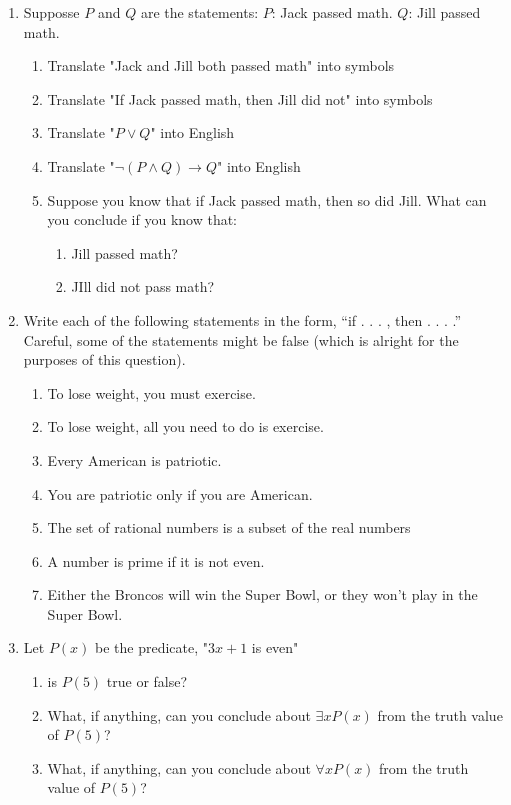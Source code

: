 \documentclass[11pt, a4paper]{article}
\newcommand\setItemNumber[1]{\setcounter{enumi}{\numexpr#1-1\relax}}
\begin{document}
\begin{enumerate}
    \setItemNumber{3}
    \item Supposse $P$ and $Q$ are the statements: $P$: Jack passed math. $Q$: Jill passed math.
        \begin{enumerate}
            \item Translate "Jack and Jill both passed math" into symbols
            \item Translate "If Jack passed math, then Jill did not" into symbols
            \item Translate "$P \lor Q$" into English
            \item Translate "$ \neg(P \land Q) \rightarrow Q$" into English
            \item Suppose you know that if Jack passed math, then so did Jill. What can you conclude if you know that:
                \begin{enumerate}
                    \item Jill passed math?
                    \item JIll did not pass math?
                \end{enumerate}
        \end{enumerate}
    \setItemNumber{10}
    \item Write each of the following statements in the form, “if . . . , then . . . .” Careful, some of the statements might be false (which is alright for the purposes of this question).
        \begin{enumerate}
            \item To lose weight, you must exercise.
            \item To lose weight, all you need to do is exercise.
            \item Every American is patriotic.
            \item You are patriotic only if you are American.
            \item The set of rational numbers is a subset of the real numbers
            \item A number is prime if it is not even.
            \item Either the Broncos will win the Super Bowl, or they won’t play in the Super Bowl.
        \end{enumerate}

    \setItemNumber{12}
    \item Let $P(x)$ be the predicate, "$3x + 1$ is even"
        \begin{enumerate}
            \item is $P(5)$ true or false?
            \item What, if anything, can you conclude about $\exists xP(x)$ from the truth value of $P(5)$?
            \item What, if anything, can you conclude about $\forall xP(x)$ from the truth value of $P(5)$?
        \end{enumerate}


\end{enumerate}
\end{document}
